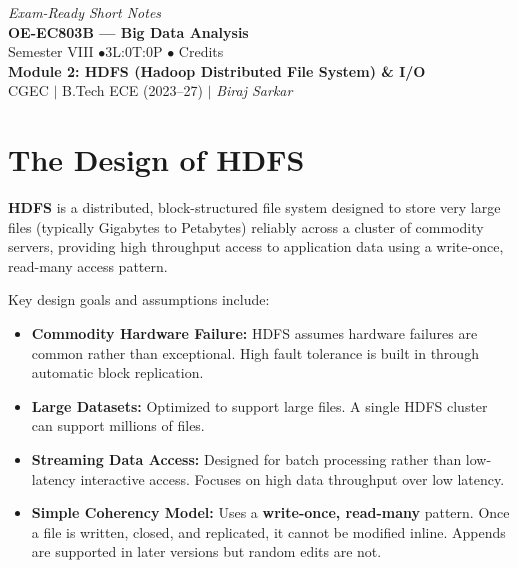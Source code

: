 \documentclass[12pt,a4paper]{article}
\begin{document}
\begin{center}
  \hfill \textit{Exam-Ready Short Notes} \\
  \vspace{6pt}
  {\LARGE\bfseries\color{myred} OE-EC803B --- Big Data Analysis}\\[5pt]
  {\normalsize\color{mydark} Semester VIII \quad$\bullet$\quad 3L:0T:0P \quad$\bullet$ Credits}\\[3pt]
  {\normalsize\color{myteal}\textbf{Module 2: HDFS (Hadoop Distributed File System) \& I/O}}\\[3pt]
  {\small\color{mydark} CGEC \;$|$\; B.Tech ECE (2023--27) \;$|$\; \textit{Biraj Sarkar}}
\end{center}
\vspace{2pt}
\noindent{\color{myred}\rule{\linewidth}{1.5pt}}
\vspace{2pt}

\hypersetup{linkcolor=mydark}
\tableofcontents
\hypersetup{linkcolor=myteal}
\newpage

\section{The Design of HDFS}

\begin{tcolorbox}[defbox, title={Hadoop Distributed File System (HDFS)}]
  \textbf{HDFS} is a distributed, block-structured file system designed to store very large files (typically Gigabytes to Petabytes) reliably across a cluster of commodity servers, providing high throughput access to application data using a write-once, read-many access pattern.
\end{tcolorbox}

Key design goals and assumptions include:
\begin{itemize}[leftmargin=*, itemsep=3pt]
  \item \textbf{Commodity Hardware Failure:} HDFS assumes hardware failures are common rather than exceptional. High fault tolerance is built in through automatic block replication.
  \item \textbf{Large Datasets:} Optimized to support large files. A single HDFS cluster can support millions of files.
  \item \textbf{Streaming Data Access:} Designed for batch processing rather than low-latency interactive access. Focuses on high data throughput over low latency.
  \item \textbf{Simple Coherency Model:} Uses a \textbf{write-once, read-many} pattern. Once a file is written, closed, and replicated, it cannot be modified inline. Appends are supported in later versions but random edits are not.
\end{itemize}
\end{document}
